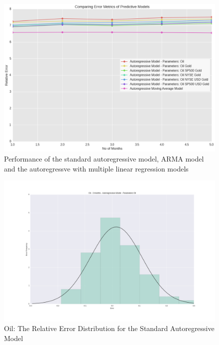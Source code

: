 \documentclass[runningheads]{llncs}
\begin{document}
\begin{figure}
\centering
\includegraphics[width=\textwidth]{ModelComparison_Oil.png}
\caption{Performance of the standard autoregressive model, ARMA model and the autoregressve with multiple linear regression models}
\label{fig:ModelComparison_Oil.png}
\end{figure}

\begin{figure}
\centering
\includegraphics[width=\textwidth]{Oil_Auto.png}
\caption{Oil: The Relative Error Distribution for the Standard Autoregressive Model}
\label{fig:Oil_Auto.png}
\end{figure}
\end{document}

